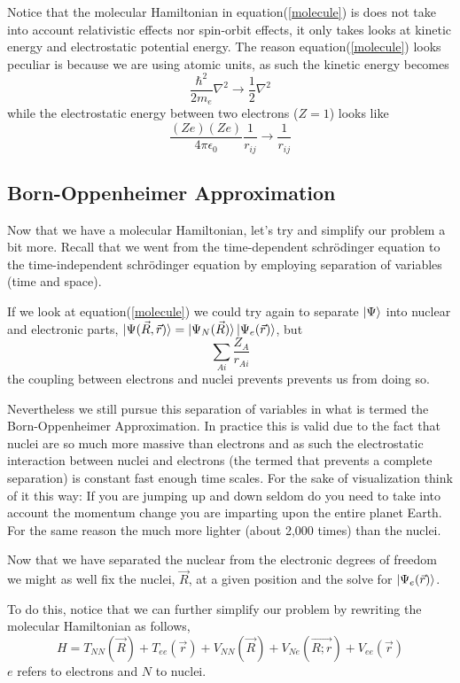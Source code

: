 \documentclass[a4paper]{article}
\begin{document}
Notice that the molecular Hamiltonian in equation(\ref{molecule}) is does not take into account relativistic effects nor spin-orbit effects, it only takes looks at kinetic energy and electrostatic potential energy.
The reason equation(\ref{molecule}) looks peculiar is because we are using atomic units, as such the kinetic energy becomes
$$
\frac{\hbar^2}{2m_e}\nabla^2 \longrightarrow \frac{1}{2}\nabla^2
$$
while the electrostatic energy between two electrons ($Z=1$) looks like
$$
\frac{(Ze)(Ze)}{4\pi\epsilon_0} \frac{1}{r_{ij}} \longrightarrow \frac{1}{r_{ij}}
$$


\subsection{Born-Oppenheimer Approximation}
Now that we have a molecular Hamiltonian, let's try and simplify our problem a bit more.
Recall that we went from the time-dependent schr\"odinger equation to the time-independent schr\"odinger equation by employing separation of variables (time and space).

If we look at equation(\ref{molecule}) we could try again to separate $\ket{\Psi}$ into nuclear and electronic parts, $\ket{\Psi(\vec{R}, \vec{r})} = \ket{\Psi_N(\vec{R})} \ket{\Psi_e (\vec{r})}$, but
$$
\sum_{Ai} \frac{Z_A}{r_{Ai}}
$$
the coupling between electrons and nuclei prevents prevents us from doing so.

Nevertheless we still pursue this separation of variables in what is termed the Born-Oppenheimer Approximation.
In practice this is valid due to the fact that nuclei are so much more massive than electrons and as such the electrostatic interaction between nuclei and electrons (the termed that prevents a complete separation) is constant fast enough time scales.
For the sake of visualization think of it this way: If you are jumping up and down seldom do you need to take into account the momentum change you are imparting upon the entire planet Earth. For the same reason the much more lighter (about 2,000 times) than the nuclei.

Now that we have separated the nuclear from the electronic degrees of freedom we might as well fix the nuclei, $\vec{R}$, at a given position and the solve for $\ket{\Psi_e (\vec{r})}$.

To do this, notice that we can further simplify our problem by rewriting the molecular Hamiltonian as follows,
$$
H = T_{NN} (\vec{R}) + T_{ee} (\vec{r}) + V_{NN} (\vec{R}) + V_{Ne} (\vec{R;r}) + V_{ee} (\vec{r})
$$
$e$ refers to electrons and $N$ to nuclei.
\end{document}
